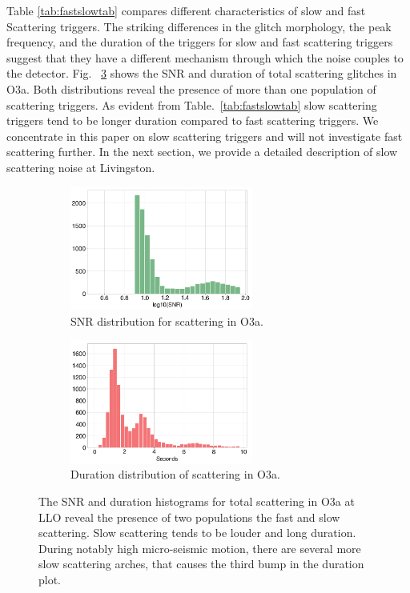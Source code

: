 \documentclass[12pt]{iopart}
\begin{document}
Table \ref{tab:fastslowtab} compares different characteristics of slow and fast Scattering triggers. The striking differences in the glitch morphology, the peak frequency, and the duration of the triggers for slow and fast scattering triggers suggest that they have a different mechanism through which the noise couples to the detector. Fig. ~\ref{fig:snrdur} shows the SNR and duration of total scattering glitches in O3a. Both distributions reveal the presence of more than one population of scattering triggers. As evident from Table.~\ref{tab:fastslowtab} slow scattering triggers tend to be longer duration compared to fast scattering triggers. We concentrate in this paper on slow scattering triggers and will not investigate fast scattering further. In the next section, we provide a detailed description of slow scattering noise at Livingston.
\begin{figure}[h]
\captionsetup[subfigure]{font=scriptsize,labelfont=scriptsize}
   \centering
    \begin{subfigure}[b]{0.45\textwidth}
        \centering
         \includegraphics[width= 6cm]{histsnr4b.png}
         \caption{SNR distribution for scattering in O3a.}
         \label{fig:histsnr}
    \end{subfigure}
    \hfill
    \begin{subfigure}[b]{0.5\textwidth}
        \centering
         \includegraphics[width =6cm]{histdur4b.png}
         \caption{ Duration distribution of scattering in O3a.}
         \label{fig:histdur}
         
    
    \end{subfigure}
    \caption{The SNR and duration histograms for total scattering in O3a at LLO reveal the presence of two populations the fast and slow scattering. Slow scattering tends to be louder and long duration. During notably high micro-seismic motion, there are several more slow scattering arches, that causes the third bump in the duration plot.}
    \label{fig:snrdur}
    
\end{figure}
\end{document}
